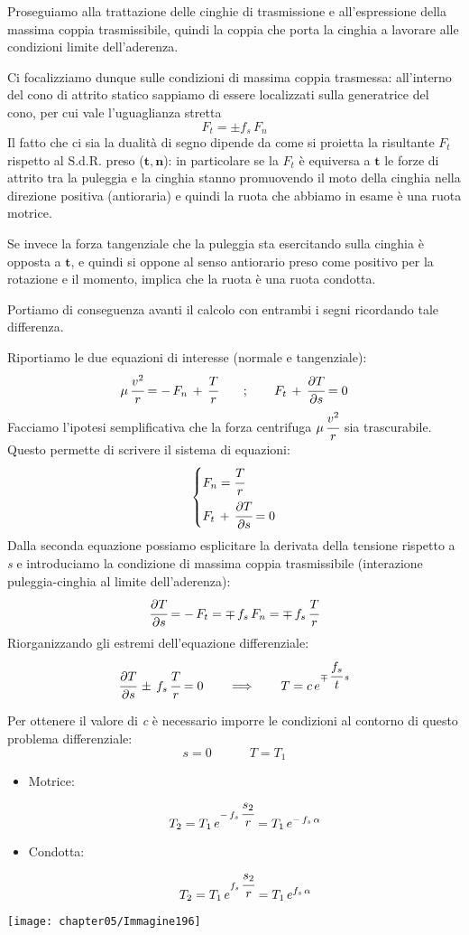 Proseguiamo alla trattazione delle cinghie di trasmissione e all'espressione della massima coppia trasmissibile, quindi la coppia che porta la cinghia a lavorare alle condizioni limite dell'aderenza.

Ci focalizziamo dunque sulle condizioni di massima coppia trasmessa: all'interno del cono di attrito statico sappiamo di essere localizzati sulla generatrice del cono, per cui vale l'uguaglianza stretta
\[F_t = \pm f_s\,F_n\]
Il fatto che ci sia la dualità di segno dipende da come si proietta la risultante $F_t$ rispetto al S.d.R. preso ($\mathbf{t}, \mathbf{n}$): in particolare se la $F_t$ è equiversa a $\mathbf{t}$ le forze di attrito  tra la puleggia e la cinghia stanno promuovendo il moto della cinghia nella direzione positiva (antioraria) e quindi la ruota che abbiamo in esame è una ruota motrice.

Se invece la forza tangenziale che la puleggia sta esercitando sulla cinghia è opposta a $\mathbf{t}$, e quindi si oppone al senso antiorario preso come positivo per la rotazione e il momento, implica che la ruota è una ruota condotta.

Portiamo di conseguenza avanti il calcolo con entrambi i segni ricordando tale differenza.

Riportiamo le due equazioni di interesse (normale e tangenziale):
\[\mu\,\cfrac{v^2}{r} = -\,F_n\,+\,\cfrac{T}{r}\qquad;\qquad F_t\,+\,\cfrac{\partial T}{\partial s} = 0\]
Facciamo l'ipotesi semplificativa che la forza centrifuga $\mu\,\cfrac{v^2}{r}$ sia trascurabile. Questo permette di scrivere il sistema di equazioni:
\[
\begin{dcases}
F_n = \cfrac{T}{r}\\
F_t\,+\,\cfrac{\partial T}{\partial s} = 0
\end{dcases}
\]
Dalla seconda equazione possiamo esplicitare la derivata della tensione rispetto a \emph{s} e introduciamo la condizione di massima coppia trasmissibile (interazione puleggia-cinghia al limite dell'aderenza):
\[\cfrac{\partial T}{\partial s} = -\,F_t = \mp\,f_s\,F_n=\mp\,f_s\,\cfrac{T}{r}\]
Riorganizzando gli estremi dell'equazione differenziale:
\[\cfrac{\partial T}{\partial s}\,\pm\,f_s\,\cfrac{T}{r}=0\qquad\Longrightarrow\qquad T = c\,e^{\mp\,\cfrac{f_s}{t}\,s}\]

\begin{minipage}{.5\textwidth}
Per ottenere il valore di \emph{c} è necessario imporre le condizioni al contorno di questo problema differenziale:
\[s= 0\qquad\quad T = T_1\]

\begin{itemize}
\item Motrice:
\[T_2 = T_1\,e^{-\,f_s\,\cfrac{s_2}{r}} = T_1\,e^{-\,f_s\,\alpha}\]
\item Condotta:
\[T_2 = T_1\,e^{f_s\,\cfrac{s_2}{r}} = T_1\,e^{f_s\,\alpha}\]
\end{itemize}
\end{minipage}
\hfill
\begin{minipage}{.5\textwidth}
\centering
\texttt{[image: chapter05/Immagine196]}
\end{minipage}
\vspace{1mm}

